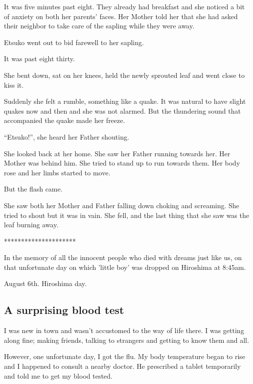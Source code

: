 \documentclass[twoside,11pt,titlepage]{article}
\begin{document}
It was five minutes past eight. They already had breakfast and she noticed a bit of anxiety on both her parents' faces. Her Mother told her that she had asked their neighbor to take care of the sapling while they were away.

 Etsuko went out to bid farewell to her sapling.

 It was past eight thirty.

 She bent down, sat on her knees, held the newly sprouted leaf and went close to kiss it.

Suddenly she felt a rumble, something like a quake. It was natural to have slight quakes now and then and she was not alarmed. But the thundering sound that accompanied the quake made her freeze.

``Etsuko!'', she heard her Father shouting.

She looked back at her home. She saw her Father running towards her. Her Mother was behind him. She tried to stand up to run towards them. Her body rose and her limbs started to move.

But the flash came.

She saw both her Mother and Father falling down choking and screaming. She tried to shout but it was in vain. She fell, and the last thing that she saw was the leaf burning away.

\bigskip
\begin{center}
*********************
\end{center}

 In the memory of all the innocent people who died with dreams just like us, on that unfortunate day on which 'little boy' was dropped on Hiroshima at 8:45am.

 August 6th. Hiroshima day.
\newpage

\begin{center}
  \section{A surprising blood test}
\end{center}
\bigskip
\bigskip
\bigskip

I was new in town and wasn't accustomed to the way of life there. I was getting along fine; making friends, talking to strangers and getting to know them and all.

However, one unfortunate day, I got the flu. My body temperature began to rise and I happened to consult a nearby doctor. He prescribed a tablet temporarily and told me to get my blood tested.
\end{document}
